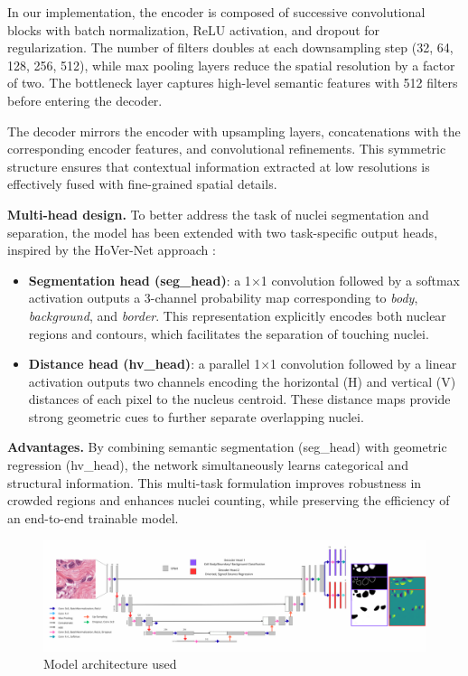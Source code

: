\documentclass[target=bach,aauheader=,style=]{thud}
\begin{document}
In our implementation, the encoder is composed of successive convolutional blocks with batch normalization, ReLU activation, and dropout for regularization. 
The number of filters doubles at each downsampling step (32, 64, 128, 256, 512), while max pooling layers reduce the spatial resolution by a factor of two. 
The bottleneck layer captures high-level semantic features with 512 filters before entering the decoder.

The decoder mirrors the encoder with upsampling layers, concatenations with the corresponding encoder features, and convolutional refinements. 
This symmetric structure ensures that contextual information extracted at low resolutions is effectively fused with fine-grained spatial details.

\noindent\textbf{Multi-head design.}  
To better address the task of nuclei segmentation and separation, the model has been extended with two task-specific output heads, inspired by the HoVer-Net approach \cite{graham2019hovernet}:  
\begin{itemize}
    \item \textbf{Segmentation head (seg\_head)}: a 1$\times$1 convolution followed by a softmax activation outputs a 3-channel probability map corresponding to \textit{body}, \textit{background}, and \textit{border}. This representation explicitly encodes both nuclear regions and contours, which facilitates the separation of touching nuclei.  
    \item \textbf{Distance head (hv\_head)}: a parallel 1$\times$1 convolution followed by a linear activation outputs two channels encoding the horizontal (H) and vertical (V) distances of each pixel to the nucleus centroid. These distance maps provide strong geometric cues to further separate overlapping nuclei.  
\end{itemize}

\noindent\textbf{Advantages.}  
By combining semantic segmentation (seg\_head) with geometric regression (hv\_head), the network simultaneously learns categorical and structural information. 
This multi-task formulation improves robustness in crowded regions and enhances nuclei counting, while preserving the efficiency of an end-to-end trainable model.
\begin{figure}[H] %
    \centering
    \includegraphics[width=1\textwidth]{imgs/model.png}
    \caption{Model architecture used}
    \label{fig:Unet}
\end{figure}
\end{document}
